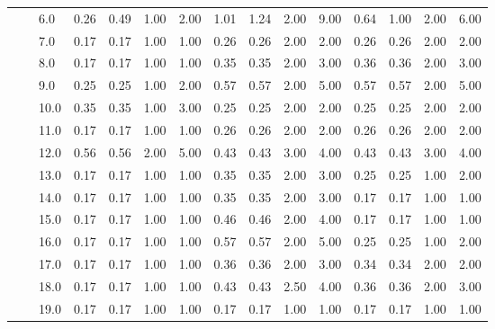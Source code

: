 \begin{tabular}{lllrrrrrrrrrrrr}
       &     & 6.0  &       0.26 &      0.49 & 1.00 &   2.00 &       1.01 &      1.24 &  2.00 &   9.00 &       0.64 &      1.00 &  2.00 &   6.00 \\
       &     & 7.0  &       0.17 &      0.17 & 1.00 &   1.00 &       0.26 &      0.26 &  2.00 &   2.00 &       0.26 &      0.26 &  2.00 &   2.00 \\
       &     & 8.0  &       0.17 &      0.17 & 1.00 &   1.00 &       0.35 &      0.35 &  2.00 &   3.00 &       0.36 &      0.36 &  2.00 &   3.00 \\
       &     & 9.0  &       0.25 &      0.25 & 1.00 &   2.00 &       0.57 &      0.57 &  2.00 &   5.00 &       0.57 &      0.57 &  2.00 &   5.00 \\
       &     & 10.0 &       0.35 &      0.35 & 1.00 &   3.00 &       0.25 &      0.25 &  2.00 &   2.00 &       0.25 &      0.25 &  2.00 &   2.00 \\
       &     & 11.0 &       0.17 &      0.17 & 1.00 &   1.00 &       0.26 &      0.26 &  2.00 &   2.00 &       0.26 &      0.26 &  2.00 &   2.00 \\
       &     & 12.0 &       0.56 &      0.56 & 2.00 &   5.00 &       0.43 &      0.43 &  3.00 &   4.00 &       0.43 &      0.43 &  3.00 &   4.00 \\
       &     & 13.0 &       0.17 &      0.17 & 1.00 &   1.00 &       0.35 &      0.35 &  2.00 &   3.00 &       0.25 &      0.25 &  1.00 &   2.00 \\
       &     & 14.0 &       0.17 &      0.17 & 1.00 &   1.00 &       0.35 &      0.35 &  2.00 &   3.00 &       0.17 &      0.17 &  1.00 &   1.00 \\
       &     & 15.0 &       0.17 &      0.17 & 1.00 &   1.00 &       0.46 &      0.46 &  2.00 &   4.00 &       0.17 &      0.17 &  1.00 &   1.00 \\
       &     & 16.0 &       0.17 &      0.17 & 1.00 &   1.00 &       0.57 &      0.57 &  2.00 &   5.00 &       0.25 &      0.25 &  1.00 &   2.00 \\
       &     & 17.0 &       0.17 &      0.17 & 1.00 &   1.00 &       0.36 &      0.36 &  2.00 &   3.00 &       0.34 &      0.34 &  2.00 &   2.00 \\
       &     & 18.0 &       0.17 &      0.17 & 1.00 &   1.00 &       0.43 &      0.43 &  2.50 &   4.00 &       0.36 &      0.36 &  2.00 &   3.00 \\
       &     & 19.0 &       0.17 &      0.17 & 1.00 &   1.00 &       0.17 &      0.17 &  1.00 &   1.00 &       0.17 &      0.17 &  1.00 &   1.00 \\

\end{tabular}
